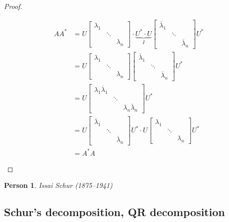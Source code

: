 \documentclass[a4paper]{article}
\numberwithin{lecref}{section}
\newtheorem*{Person}{Person}
\begin{document}
\begin{proof}
\begin{description}
      \begin{align*}
        A A^* &= U \begin{bmatrix} \lambda_1 & & \\ & \ddots & \\ & & \lambda_n \end{bmatrix} \cdot \underbrace{U^* \cdot U}_{I} \begin{bmatrix} \overline{\lambda}_1 & & \\ & \ddots & \\ & & \overline{\lambda}_n \end{bmatrix} U^* \\
          &= U \begin{bmatrix} \lambda_1 & & \\ & \ddots & \\ & & \lambda_n \end{bmatrix} \begin{bmatrix} \overline\lambda_1 & & \\ & \ddots & \\ & & \overline\lambda_n \end{bmatrix} U^* \\
          &= U \begin{bmatrix} \lambda_1 \overline\lambda_1 & & \\ & \ddots & \\ & & \lambda_n \overline\lambda_n \end{bmatrix} U^* \\
          &= U \begin{bmatrix} \overline\lambda_1 & & \\ & \ddots & \\ & & \overline\lambda_n \end{bmatrix} U^* \cdot U \begin{bmatrix} \lambda_1 & & \\ & \ddots & \\ & & \lambda_n \end{bmatrix} U^* \\
          &= A^* A
      \end{align*}
  \end{description}
\end{proof}

\begin{Person}
  Issai Schur (1875--1941)
\end{Person}

\subsection{Schur's decomposition, QR decomposition}
\end{document}
